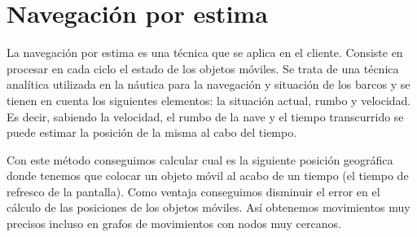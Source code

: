 \newpage

\section{Navegación por estima}

La navegación por estima es una técnica que se aplica en el cliente. Consiste en procesar en cada ciclo el estado de los objetos móviles. Se trata de una técnica analítica utilizada en la náutica para la navegación y situación de los barcos y se tienen en cuenta los siguientes elementos: la situación actual, rumbo y velocidad. Es decir, sabiendo la velocidad, el rumbo de la nave y el tiempo transcurrido se puede estimar la posición de la misma al cabo del tiempo. 

Con este método conseguimos calcular cual es la siguiente posición geográfica donde tenemos que colocar un objeto móvil al acabo de un tiempo (el tiempo de refresco de la pantalla). Como ventaja conseguimos disminuir el error en el cálculo de las posiciones de los objetos móviles. Así obtenemos movimientos muy precisos incluso en grafos de movimientos con nodos muy cercanos.





